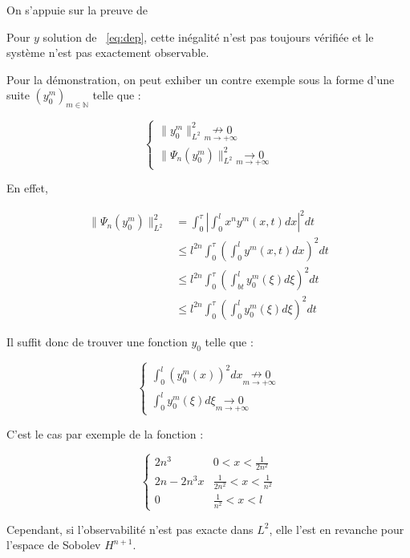 \documentclass[a4paper]{article}
\begin{document}
\begin{preuve}
	On s'appuie sur la preuve de \cite{LBrivadis}
	
Pour $y$ solution de ~\eqref{eq:dep}, cette inégalité n'est pas toujours vérifiée et le système n'est pas exactement observable.

Pour la démonstration, on peut exhiber un contre exemple sous la forme d'une suite $(y_0^m)_{m \in \mathbb{N}}$ telle que :

\[
\begin{cases}
	\|y_0^m\|^2_{L^2} \underset{m\to+\infty}{\nrightarrow 0} \\
	\| \Psi_n (y_0^m)\|_{L^2}^2 \underset{m\to+\infty}{\rightarrow 0}
\end{cases}
\]
	
En effet,

\[ 
\begin{split}
	\| \Psi_n (y_0^m)\|_{L^2}^2  &= \int_0^\tau  |\int_0^l x^n y^m(x,t) dx |^2 dt \\
	                             & \leq l^{2n}  \int_0^\tau (\int_0^l y^m(x,t)dx)^2dt \\
								 & \leq l^{2n} \int_0^\tau (\int_{bt}^l y_0^m(\xi)d\xi)^2dt \\
								 & \leq l^{2n} \int_0^\tau (\int_0^l y_0^m(\xi)d\xi)^2 dt
\end{split}
\]

Il suffit donc de trouver une fonction $y_0$ telle que :

\[
\begin{cases}
	\int_0^l (y_0^m(x))^2 dx \underset{m\to+\infty}{\nrightarrow 0} \\
	\int_0^l y_0^m(\xi)d\xi \underset{m\to+\infty}{\rightarrow 0}
\end{cases}
\]

C'est le cas par exemple de la fonction :

\[
\begin{cases}
	2n^3 & 0 <x < \frac{1}{2n^2}\\
	2n - 2n^3x & \frac{1}{2n^2} <x<\frac{1}{n^2}\\
	0 & \frac{1}{n^2} <x<l
\end{cases}
\]

\end{preuve}

Cependant, si l'observabilité n'est pas exacte dans $L^2$, elle l'est en revanche pour l'espace de Sobolev $H^{n+1}$. 
\end{document}
